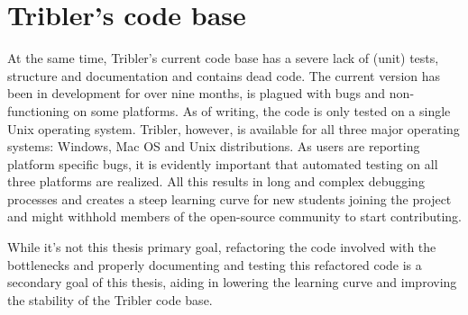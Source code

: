 \section{Tribler's code base}
At the same time, Tribler's current code base has a severe lack of (unit) tests, structure and documentation and contains dead code.
The current version has been in development for over nine months, is plagued with bugs and non-functioning on some platforms.
As of writing, the code is only tested on a single Unix operating system.
Tribler, however, is available for all three major operating systems: Windows, Mac OS and Unix distributions.
As users are reporting platform specific bugs, it is evidently important that automated testing on all three platforms are realized.
All this results in long and complex debugging processes and creates a steep learning curve for new students joining the project and might withhold members of the open-source community to start contributing.

While it's not this thesis primary goal, refactoring the code involved with the bottlenecks and properly documenting and testing this refactored code is a secondary goal of this thesis, aiding in lowering the learning curve and improving the stability of the Tribler code base.



